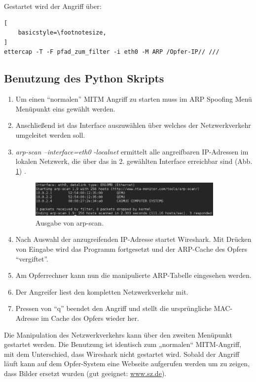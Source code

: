 Gestartet wird der Angriff über:
\lstset{language=bash}
\begin{lstlisting}[
	basicstyle=\footnotesize,
]
ettercap -T -F pfad_zum_filter -i eth0 -M ARP /Opfer-IP// ///
\end{lstlisting}

\subsection{Benutzung des Python Skripts}
\begin{enumerate}
	\item Um einen "`normalen"' MITM Angriff zu starten muss im ARP Spoofing Menü Menüpunkt eins gewählt werden. 
	\item Anschließend ist das Interface auszuwählen über welches der Netzwerkverkehr umgeleitet werden soll.
	\item \textit{arp-scan --interface=eth0 -localnet} ermittelt alle angreifbaren IP-Adressen im lokalen Netzwerk, die über das in 2. gewählten Interface erreichbar sind (Abb. \ref{fig:arp_scan}) .
	\begin{figure}[h!]
	\centering
		\includegraphics[width=0.90\textwidth]{bilder/arpSpoofing/arp_scan.pdf}
	\caption{Ausgabe von arp-scan.}
	\label{fig:arp_scan}
\end{figure}
	\item Nach Auswahl der anzugreifenden IP-Adresse startet Wireshark. Mit Drücken von Eingabe wird das Programm fortgesetzt und der ARP-Cache des Opfers "`vergiftet"'.
	\item Am Opferrechner kann nun die manipulierte ARP-Tabelle eingesehen werden.
	\item Der Angreifer liest den kompletten Netzwerkverkehr mit.
	\item Pressen von "`q"' beendet den Angriff und stellt die ursprüngliche MAC-Adresse im Cache des Opfers wieder her. 
\end{enumerate}

Die Manipulation des Netzwerkverkehrs kann über den zweiten Menüpunkt gestartet werden. Die Benutzung ist identisch zum „normalen“ MITM-Angriff, mit dem Unterschied, dass Wireshark nicht gestartet wird. Sobald der Angriff läuft kann auf dem Opfer-System eine Webseite aufgerufen werden um zu zeigen, dass Bilder ersetzt wurden (gut geeignet: \url{www.sz.de}).


